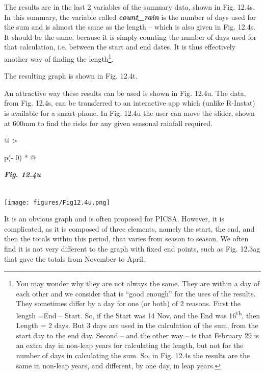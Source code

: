 \documentclass[
  letterpaper,
  DIV=11,
  numbers=noendperiod]{scrreprt}
\begin{document}
The results are in the last 2 variables of the summary data, shown in
Fig. 12.4s. In this summary, the variable called
\textbf{\emph{count\_rain}} is the number of days used for the sum and
is almost the same as the length -- which is also given in Fig. 12.4s.
It should be the same, because it is simply counting the number of days
used for that calculation, i.e. between the start and end dates. It is
thus effectively another way of finding the length\footnote{You may
  wonder why they are not always the same. They are within a day of each
  other and we consider that is ``good enough'' for the uses of the
  results. They sometimes differ by a day for one (or both) of 2
  reasons. First the length =End -- Start. So, if the Start was 14 Nov,
  and the End was 16\textsuperscript{th}, then Length = 2 days. But 3
  days are used in the calculation of the sum, from the start day to the
  end day. Second -- and the other way -- is that February 29 is an
  extra day in non-leap years for calculating the length, but not for
  the number of days in calculating the sum. So, in Fig. 12.4s the
  results are the same in non-leap years, and different, by one day, in
  leap years.}.

The resulting graph is shown in Fig. 12.4t.

An attractive way these results can be used is shown in Fig. 12.4u. The
data, from Fig. 12.4s, can be transferred to an interactive app which
(unlike R-Instat) is available for a smart-phone. In Fig. 12.4u the user
can move the slider, shown at 600mm to find the risks for any given
seasonal rainfall required.

\begin{longtable}[]{@{}
  >{\raggedright\arraybackslash}p{(\columnwidth - 0\tabcolsep) * }@{}}
\toprule\noalign{}
\begin{minipage}[b]{\linewidth}\raggedright
\textbf{\emph{Fig. 12.4u}}
\end{minipage} \\
\midrule\noalign{}
\endhead
\bottomrule\noalign{}
\endlastfoot
\texttt{[image: figures/Fig12.4u.png]} \\
\end{longtable}

It is an obvious graph and is often proposed for PICSA. However, it is
complicated, as it is composed of three elements, namely the start, the
end, and then the totals within this period, that varies from season to
season. We often find it is not very different to the graph with fixed
end points, such as Fig. 12.3ag that gave the totals from November to
April.
\end{document}
